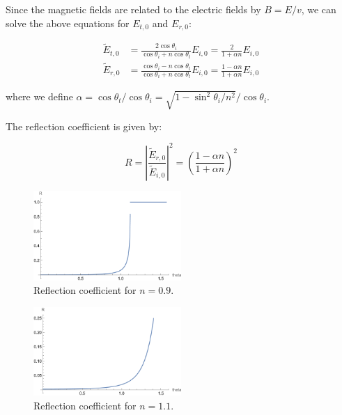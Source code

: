 \documentclass[12pt]{article}
\begin{document}
Since the magnetic fields are related to the electric fields by $B = E/v$, we can solve the above equations for $E_{t, 0}$ and $E_{r, 0}$:

\begin{equation}
\begin{split}
    \tilde{E}_{t, 0} &= \frac{2 \cos{\theta_{i}}}{\cos{\theta_{i}} + n\cos{\theta_{t}}} E_{i, 0} = \frac{2}{1 + \alpha n} E_{i, 0} \\
    \tilde{E}_{r, 0} &= \frac{\cos{\theta_{i}} - n\cos{\theta_{t}}}{\cos{\theta_{i}} + n\cos{\theta_{t}}} E_{i, 0} = \frac{1 - \alpha n}{1 + \alpha n} E_{i, 0}
\end{split}
\end{equation}

where we define $\alpha = \cos{\theta_{t}}/\cos{\theta_{i}} = \sqrt{1 - \sin^{2}{\theta_{i}}/n^{2}}/\cos{\theta_{i}}$.

The reflection coefficient is given by:

\begin{equation}
    R = \left\lvert \frac{\tilde{E}_{r, 0}}{\tilde{E}_{i, 0}} \right\rvert^{2} = \left( \frac{1 - \alpha n}{1 + \alpha n} \right)^{2}
\end{equation}

\begin{figure}[ht]
    \centering
    \includegraphics[width=0.5\textwidth]{../plots/electro_3_3_a.png}
    \caption{Reflection coefficient for $n = 0.9$.}
    \label{fig:reflection_coefficient_1}
\end{figure}

\begin{figure}[ht]
    \centering
    \includegraphics[width=0.5\textwidth]{../plots/electro_3_3_b.png}
    \caption{Reflection coefficient for $n = 1.1$.}
    \label{fig:reflection_coefficient_2}
\end{figure}
\end{document}
